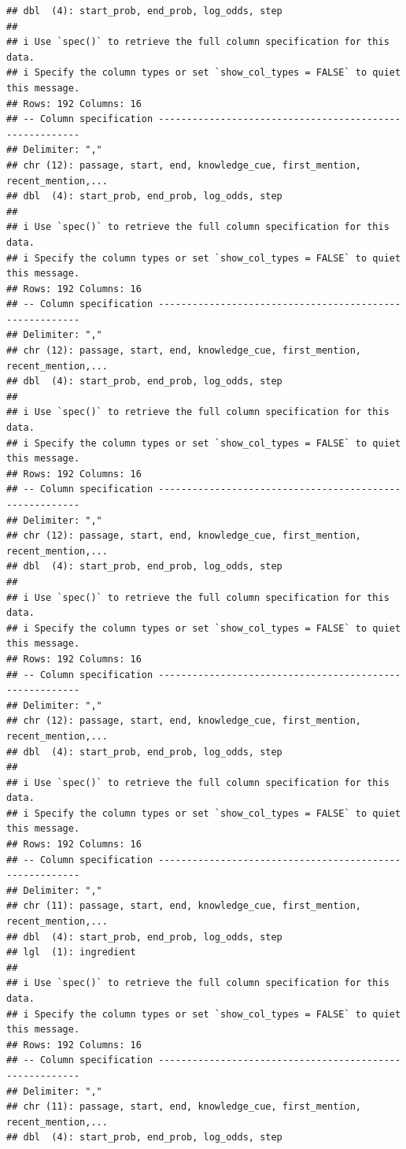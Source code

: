 \documentclass[
]{article}
\begin{document}
\begin{verbatim}
## dbl  (4): start_prob, end_prob, log_odds, step
## 
## i Use `spec()` to retrieve the full column specification for this data.
## i Specify the column types or set `show_col_types = FALSE` to quiet this message.
## Rows: 192 Columns: 16
## -- Column specification --------------------------------------------------------
## Delimiter: ","
## chr (12): passage, start, end, knowledge_cue, first_mention, recent_mention,...
## dbl  (4): start_prob, end_prob, log_odds, step
## 
## i Use `spec()` to retrieve the full column specification for this data.
## i Specify the column types or set `show_col_types = FALSE` to quiet this message.
## Rows: 192 Columns: 16
## -- Column specification --------------------------------------------------------
## Delimiter: ","
## chr (12): passage, start, end, knowledge_cue, first_mention, recent_mention,...
## dbl  (4): start_prob, end_prob, log_odds, step
## 
## i Use `spec()` to retrieve the full column specification for this data.
## i Specify the column types or set `show_col_types = FALSE` to quiet this message.
## Rows: 192 Columns: 16
## -- Column specification --------------------------------------------------------
## Delimiter: ","
## chr (12): passage, start, end, knowledge_cue, first_mention, recent_mention,...
## dbl  (4): start_prob, end_prob, log_odds, step
## 
## i Use `spec()` to retrieve the full column specification for this data.
## i Specify the column types or set `show_col_types = FALSE` to quiet this message.
## Rows: 192 Columns: 16
## -- Column specification --------------------------------------------------------
## Delimiter: ","
## chr (12): passage, start, end, knowledge_cue, first_mention, recent_mention,...
## dbl  (4): start_prob, end_prob, log_odds, step
## 
## i Use `spec()` to retrieve the full column specification for this data.
## i Specify the column types or set `show_col_types = FALSE` to quiet this message.
## Rows: 192 Columns: 16
## -- Column specification --------------------------------------------------------
## Delimiter: ","
## chr (11): passage, start, end, knowledge_cue, first_mention, recent_mention,...
## dbl  (4): start_prob, end_prob, log_odds, step
## lgl  (1): ingredient
## 
## i Use `spec()` to retrieve the full column specification for this data.
## i Specify the column types or set `show_col_types = FALSE` to quiet this message.
## Rows: 192 Columns: 16
## -- Column specification --------------------------------------------------------
## Delimiter: ","
## chr (11): passage, start, end, knowledge_cue, first_mention, recent_mention,...
## dbl  (4): start_prob, end_prob, log_odds, step

\end{verbatim}
\end{document}
